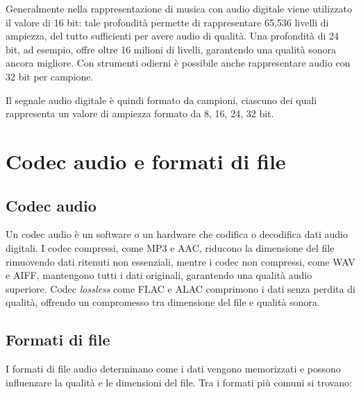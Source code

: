 \documentclass{book}
\begin{document}
Generalmente nella rappresentazione di musica con audio digitale viene utilizzato il valore di 16 bit: tale profondità permette di rappresentare 65,536 livelli di ampiezza, del tutto sufficienti per avere audio di qualità. Una profondità di 24 bit, ad esempio, offre oltre 16 milioni di livelli, garantendo una qualità sonora ancora migliore. Con strumenti odierni è possibile anche rappresentare audio con 32 bit per campione.

Il segnale audio digitale è quindi formato da campioni, ciascuno dei quali rappresenta un valore di ampiezza formato da 8, 16, 24, 32 bit.

\section{Codec audio e formati di file}

\subsection{Codec audio}

Un codec audio è un software o un hardware che codifica o decodifica dati audio digitali. I codec compressi, come MP3 e AAC, riducono la dimensione del file rimuovendo dati ritenuti non essenziali, mentre i codec non compressi, come WAV e AIFF, mantengono tutti i dati originali, garantendo una qualità audio superiore. Codec \emph{lossless} come FLAC e ALAC comprimono i dati senza perdita di qualità, offrendo un compromesso tra dimensione del file e qualità sonora.

\subsection{Formati di file}

I formati di file audio determinano come i dati vengono memorizzati e possono influenzare la qualità e le dimensioni del file. Tra i formati più comuni si trovano:
\end{document}
